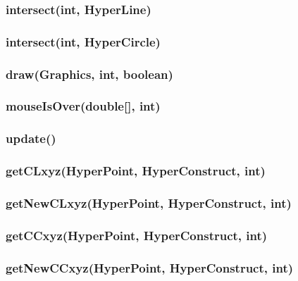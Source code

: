 \documentclass[a4paper,10pt]{report}
\begin{document}
\subsubsection{intersect(int, HyperLine)}
\subsubsection{intersect(int, HyperCircle)}
\subsubsection{draw(Graphics, int, boolean)}
\subsubsection{mouseIsOver(double[], int)}
\subsubsection{update()}
\subsubsection{getCLxyz(HyperPoint, HyperConstruct, int)}
\subsubsection{getNewCLxyz(HyperPoint, HyperConstruct, int)}
\subsubsection{getCCxyz(HyperPoint, HyperConstruct, int)}
\subsubsection{getNewCCxyz(HyperPoint, HyperConstruct, int)}
\end{document}
